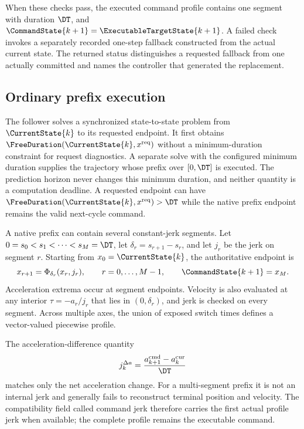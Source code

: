When these checks pass, the executed command profile contains one segment with
duration \(\DT\), and
\(\CommandState{k+1}=\ExecutableTargetState{k+1}\).  A failed check invokes a
separately recorded one-step fallback constructed from the actual current
state.  The returned status distinguishes a requested fallback from one
actually committed and names the controller that generated the replacement.

\subsection{Ordinary \Ruckig{} prefix execution}

The \OrdinaryRuckig{} follower solves a synchronized state-to-state problem
from \(\CurrentState{k}\) to its requested endpoint.  It first obtains
\(\FreeDuration(\CurrentState{k},x^{\mathrm{req}})\) without a minimum-duration
constraint for request diagnostics.  A separate solve with the configured
minimum duration supplies the trajectory whose prefix over \([0,\DT]\) is
executed.  The prediction horizon never changes this minimum duration, and
neither quantity is a computation deadline.  A requested endpoint can have
\(\FreeDuration(\CurrentState{k},x^{\mathrm{req}})>\DT\) while the native
prefix endpoint remains the valid next-cycle command.

A native prefix can contain several constant-jerk segments.  Let
\(0=s_0<s_1<\cdots<s_M=\DT\), let
\(\delta_r=s_{r+1}-s_r\), and let \(j_r\) be the jerk on segment \(r\).
Starting from \(x_0=\CurrentState{k}\), the authoritative endpoint is
\begin{equation}
  x_{r+1}=\Phi_{\delta_r}(x_r,j_r),
  \qquad r=0,\ldots,M-1,
  \qquad
  \CommandState{k+1}=x_M.
  \label{eq:piecewise-prefix}
\end{equation}
Acceleration extrema occur at segment endpoints.  Velocity is also evaluated
at any interior \(\tau=-a_r/j_r\) that lies in
\((0,\delta_r)\), and jerk is checked on every segment.  Across multiple axes,
the union of exposed switch times defines a vector-valued piecewise profile.

The acceleration-difference quantity
\begin{equation}
  j_k^{\Delta a}=
  \frac{a_{k+1}^{\mathrm{cmd}}-a_k^{\mathrm{cur}}}{\DT}
  \label{eq:acceleration-difference-jerk}
\end{equation}
matches only the net acceleration change.  For a multi-segment prefix it is
not an internal jerk and generally fails to reconstruct terminal position and
velocity.  The compatibility field called command jerk therefore carries the
first actual profile jerk when available; the complete profile remains the
executable command.

